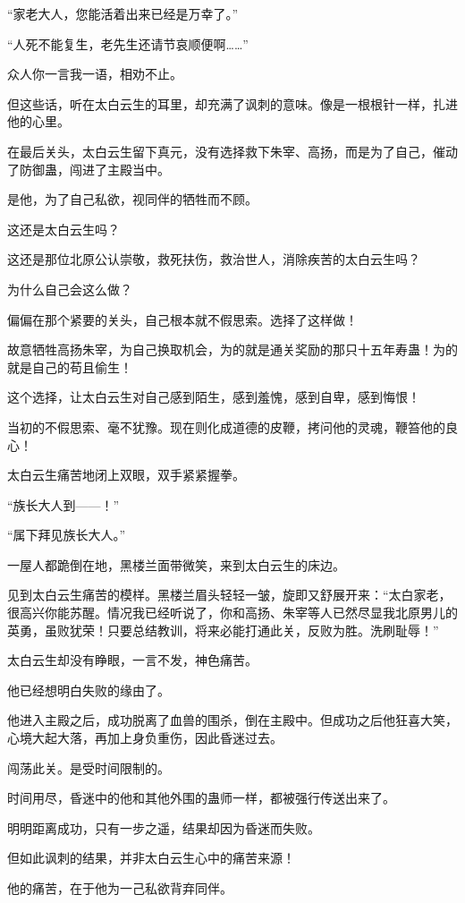 \begin{this_body}
“家老大人，您能活着出来已经是万幸了。”

“人死不能复生，老先生还请节哀顺便啊……”

众人你一言我一语，相劝不止。

但这些话，听在太白云生的耳里，却充满了讽刺的意味。像是一根根针一样，扎进他的心里。

在最后关头，太白云生留下真元，没有选择救下朱宰、高扬，而是为了自己，催动了防御蛊，闯进了主殿当中。

是他，为了自己私欲，视同伴的牺牲而不顾。

这还是太白云生吗？

这还是那位北原公认崇敬，救死扶伤，救治世人，消除疾苦的太白云生吗？

为什么自己会这么做？

偏偏在那个紧要的关头，自己根本就不假思索。选择了这样做！

故意牺牲高扬朱宰，为自己换取机会，为的就是通关奖励的那只十五年寿蛊！为的就是自己的苟且偷生！

这个选择，让太白云生对自己感到陌生，感到羞愧，感到自卑，感到悔恨！

当初的不假思索、毫不犹豫。现在则化成道德的皮鞭，拷问他的灵魂，鞭笞他的良心！

太白云生痛苦地闭上双眼，双手紧紧握拳。

“族长大人到——！”

“属下拜见族长大人。”

一屋人都跪倒在地，黑楼兰面带微笑，来到太白云生的床边。

见到太白云生痛苦的模样。黑楼兰眉头轻轻一皱，旋即又舒展开来：“太白家老，很高兴你能苏醒。情况我已经听说了，你和高扬、朱宰等人已然尽显我北原男儿的英勇，虽败犹荣！只要总结教训，将来必能打通此关，反败为胜。洗刷耻辱！”

太白云生却没有睁眼，一言不发，神色痛苦。

他已经想明白失败的缘由了。

他进入主殿之后，成功脱离了血兽的围杀，倒在主殿中。但成功之后他狂喜大笑，心境大起大落，再加上身负重伤，因此昏迷过去。

闯荡此关。是受时间限制的。

时间用尽，昏迷中的他和其他外围的蛊师一样，都被强行传送出来了。

明明距离成功，只有一步之遥，结果却因为昏迷而失败。

但如此讽刺的结果，并非太白云生心中的痛苦来源！

他的痛苦，在于他为一己私欲背弃同伴。


\end{this_body}

